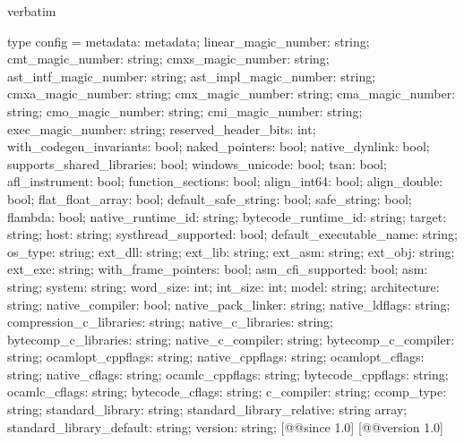 \begin{camlexample}{verbatim}
\begin{caml}
\begin{camlinput}
type config = {
  metadata: metadata;
  linear_magic_number: string;
  cmt_magic_number: string;
  cmxs_magic_number: string;
  ast_intf_magic_number: string;
  ast_impl_magic_number: string;
  cmxa_magic_number: string;
  cmx_magic_number: string;
  cma_magic_number: string;
  cmo_magic_number: string;
  cmi_magic_number: string;
  exec_magic_number: string;
  reserved_header_bits: int;
  with_codegen_invariants: bool;
  naked_pointers: bool;
  native_dynlink: bool;
  supports_shared_libraries: bool;
  windows_unicode: bool;
  tsan: bool;
  afl_instrument: bool;
  function_sections: bool;
  align_int64: bool;
  align_double: bool;
  flat_float_array: bool;
  default_safe_string: bool;
  safe_string: bool;
  flambda: bool;
  native_runtime_id: string;
  bytecode_runtime_id: string;
  target: string;
  host: string;
  systhread_supported: bool;
  default_executable_name: string;
  os_type: string;
  ext_dll: string;
  ext_lib: string;
  ext_asm: string;
  ext_obj: string;
  ext_exe: string;
  with_frame_pointers: bool;
  asm_cfi_supported: bool;
  asm: string;
  system: string;
  word_size: int;
  int_size: int;
  model: string;
  architecture: string;
  native_compiler: bool;
  native_pack_linker: string;
  native_ldflags: string;
  compression_c_libraries: string;
  native_c_libraries: string;
  bytecomp_c_libraries: string;
  native_c_compiler: string;
  bytecomp_c_compiler: string;
  ocamlopt_cppflags: string;
  native_cppflags: string;
  ocamlopt_cflags: string;
  native_cflags: string;
  ocamlc_cppflags: string;
  bytecode_cppflags: string;
  ocamlc_cflags: string;
  bytecode_cflags: string;
  c_compiler: string;
  ccomp_type: string;
  standard_library: string;
  standard_library_relative: string array;
  standard_library_default: string;
  version: string;
} [@@since 1.0]
[@@version 1.0]
\end{camlinput}
\end{caml}
\end{camlexample}
